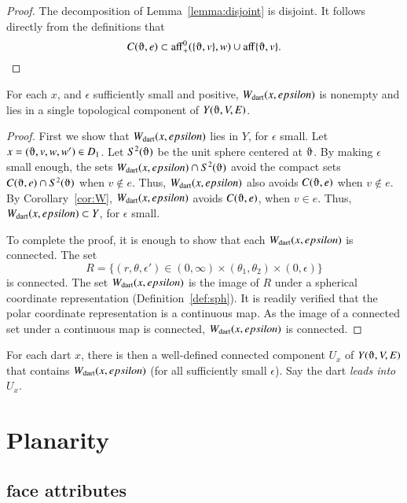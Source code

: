 \begin{proof} The decomposition of Lemma~\ref{lemma:disjoint} is
disjoint.  It follows directly from the definitions that
   $$C(\orgn,e)\subset \op{aff}_+^0(\{\orgn,v\},w) \cup 
    \op{aff}\{\orgn,v\}.$$
\end{proof}

\begin{lemma} 
For each $x$, and $\epsilon$ sufficiently small and positive,
$W_{\text{dart}}(x,epsilon)$ is nonempty and lies in a single 
topological component of $Y(\orgn,V,E)$.
\end{lemma}

\begin{proof}  First we show that $W_{\text{dart}}(x,epsilon)$ lies in $Y$,
for $\epsilon$ small.  Let $x=(\orgn,v,w,w')\in D_1$.  
Let $S^2(\orgn)$ be the unit sphere centered at $\orgn$.
By making $\epsilon$ small enough,
the sets $\Wdart(x,\epsilon)\cap S^2(\orgn)$
avoid the compact sets $C(\orgn,e)\cap S^2(\orgn)$ when $v\not\in e$.
Thus, $W_{\text{dart}}(x,epsilon)$ also avoids $C(\orgn,e)$ when $v\not\in e$.
By Corollary~\ref{cor:W}, $W_{\text{dart}}(x,epsilon)$ avoids $C(\orgn,e)$, when $v\in e$.
Thus, $W_{\text{dart}}(x,epsilon)\subset Y$, for $\epsilon$ small.

To complete the proof, it is enough to show that each $W_{\text{dart}}(x,epsilon)$ is
connected.  
The  set
   $$
   R=\{(r,\theta,\epsilon') \in (0,\infty) \times (\theta_1,\theta_2) \times (0,\epsilon)\}
   $$
is connected.
The set $W_{\text{dart}}(x,epsilon)$  is the image of $R$
under a spherical coordinate representation (Definition~\ref{def:sph}).
It is readily verified that the polar coordinate representation is
a continuous map. As the image of a connected set under a continuous map
is connected, $W_{\text{dart}}(x,epsilon)$ is connected.
\end{proof}

\begin{definition} For each dart $x$, 
there is then a well-defined connected
component $U_x$ of $Y(\orgn,V,E)$ 
that contains $W_{\text{dart}}(x,epsilon)$ (for all
sufficiently small $\epsilon$). Say the dart {\it leads into}
$U_x$.
\end{definition}


\section{Planarity}


\subsection{face attributes}


